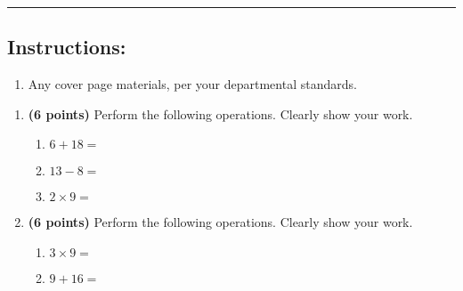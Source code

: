 \documentclass[12pt]{amsart}
\begin{document}
\vspace{.4cm}


\vspace{.4cm}

\hrule

\subsection*{Instructions:} \begin{enumerate}[1.]
\item Any cover page materials, per your departmental standards.
\end{enumerate}


\newpage
\begin{enumerate}
\item {\bf (6 points)} 
 Perform the following operations. Clearly show your work. \begin{enumerate}


\def \a{6}\def \b{18}\def \apb{24}

 
\item $\a + \b = $

\vspace{2cm}
\def \a{13}\def \dif{5}\def \b{8}

 
\item $\a - \b = $

\vspace{2cm}
\def \a{2}\def \b{9}\def \ab{11}

 
\item $\a \times \b = $ 

\vspace{2cm}
\def \vshift{-5}\def \hshift{4}\def \chang{1}\def \findval{5}\def \yval{-7}

 
\end{enumerate}


\newpage
\item {\bf (6 points)} 
 Perform the following operations. Clearly show your work. \begin{enumerate}


\def \a{3}\def \b{9}\def \ab{12}

 
\item $\a \times \b = $ 

\vspace{2cm}
\def \a{9}\def \b{16}\def \apb{25}

 
\item $\a + \b = $

\vspace{2cm}
\def \vshift{3}\def \hshift{0}\def \chang{-2}\def \findval{-2}\def \yval{7}

 
\end{enumerate}


\newpage\end{enumerate}\graphicspath{{C:/Users/iainc/anaconda3/Randomizer/Sample Course/Sample Assessment 2/}}\setcounter{page}{1}
\end{document}
